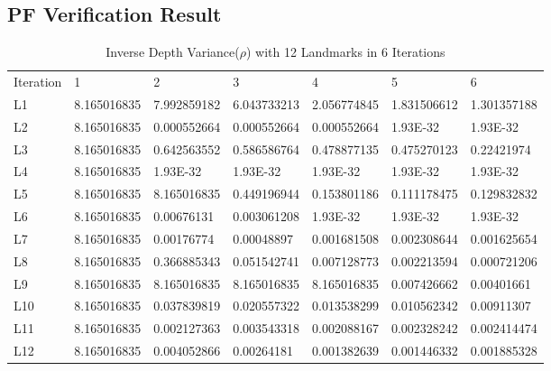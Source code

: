 \documentclass[conference]{IEEEtran}
\begin{document}
\begin{appendices}
\section{PF Verification Result}
\label{sec:pfVer}
\begin{table}[H]
\centering
\caption{Inverse Depth Variance($\rho$) with 12 Landmarks in 6 Iterations}
\label{tab:PFver}
\begin{tabular}{lllllll}
Iteration & 1           & 2           & 3           & 4           & 5           & 6           \\
L1        & 8.165016835 & 7.992859182 & 6.043733213 & 2.056774845 & 1.831506612 & 1.301357188 \\
L2        & 8.165016835 & 0.000552664 & 0.000552664 & 0.000552664 & 1.93E-32    & 1.93E-32    \\
L3        & 8.165016835 & 0.642563552 & 0.586586764 & 0.478877135 & 0.475270123 & 0.22421974  \\
L4        & 8.165016835 & 1.93E-32    & 1.93E-32    & 1.93E-32    & 1.93E-32    & 1.93E-32    \\
L5        & 8.165016835 & 8.165016835 & 0.449196944 & 0.153801186 & 0.111178475 & 0.129832832 \\
L6        & 8.165016835 & 0.00676131  & 0.003061208 & 1.93E-32    & 1.93E-32    & 1.93E-32    \\
L7        & 8.165016835 & 0.00176774  & 0.00048897  & 0.001681508 & 0.002308644 & 0.001625654 \\
L8        & 8.165016835 & 0.366885343 & 0.051542741 & 0.007128773 & 0.002213594 & 0.000721206 \\
L9        & 8.165016835 & 8.165016835 & 8.165016835 & 8.165016835 & 0.007426662 & 0.00401661  \\
L10       & 8.165016835 & 0.037839819 & 0.020557322 & 0.013538299 & 0.010562342 & 0.00911307  \\
L11       & 8.165016835 & 0.002127363 & 0.003543318 & 0.002088167 & 0.002328242 & 0.002414474 \\
L12       & 8.165016835 & 0.004052866 & 0.00264181  & 0.001382639 & 0.001446332 & 0.001885328
\end{tabular}
\end{table}
\end{appendices}
\end{document}

